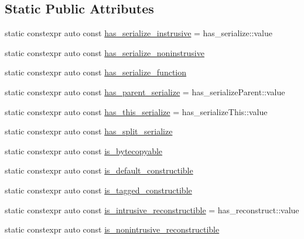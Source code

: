 \subsection*{Static Public Attributes}
\begin{DoxyCompactItemize}
\item 
static constexpr auto const \hyperlink{structcheckpoint_1_1_serializable_traits_a9e6855e572198a99854e9e8d2ac8b9d7}{has\+\_\+serialize\+\_\+instrusive} = has\+\_\+serialize\+::value
\item 
static constexpr auto const \hyperlink{structcheckpoint_1_1_serializable_traits_a2b02dea52e9cce1e6ec8e251c414e2e5}{has\+\_\+serialize\+\_\+noninstrusive}
\item 
static constexpr auto const \hyperlink{structcheckpoint_1_1_serializable_traits_a4d17a7627a8e033cccb5cf4e6b8fd0dc}{has\+\_\+serialize\+\_\+function}
\item 
static constexpr auto const \hyperlink{structcheckpoint_1_1_serializable_traits_a122e712dd9adffac78f239a7c30b0a8f}{has\+\_\+parent\+\_\+serialize} = has\+\_\+serialize\+Parent\+::value
\item 
static constexpr auto const \hyperlink{structcheckpoint_1_1_serializable_traits_ab228ede8ce64a9aaebf9ce43ac388400}{has\+\_\+this\+\_\+serialize} = has\+\_\+serialize\+This\+::value
\item 
static constexpr auto const \hyperlink{structcheckpoint_1_1_serializable_traits_a1fa333e360a0dfeafebe350436ae9141}{has\+\_\+split\+\_\+serialize}
\item 
static constexpr auto const \hyperlink{structcheckpoint_1_1_serializable_traits_a19e58ea0f510be10502e476258ed14ae}{is\+\_\+bytecopyable}
\item 
static constexpr auto const \hyperlink{structcheckpoint_1_1_serializable_traits_a4bdbe26cdd11c7ff07f84e4cfdf34e7f}{is\+\_\+default\+\_\+constructible}
\item 
static constexpr auto const \hyperlink{structcheckpoint_1_1_serializable_traits_aa6618d9f36e37127006112c73755fceb}{is\+\_\+tagged\+\_\+constructible}
\item 
static constexpr auto const \hyperlink{structcheckpoint_1_1_serializable_traits_a9879da69f4597dfb32b869142c1c46c9}{is\+\_\+intrusive\+\_\+reconstructible} = has\+\_\+reconstruct\+::value
\item 
static constexpr auto const \hyperlink{structcheckpoint_1_1_serializable_traits_a35d5afbe97197885a1513765a210837c}{is\+\_\+nonintrusive\+\_\+reconstructible}
\item 

\end{DoxyCompactItemize}
